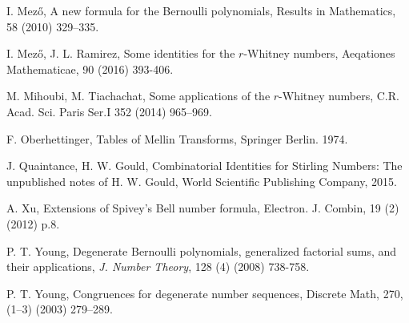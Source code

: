 \documentclass{article}%
\begin{document}
\begin{thebibliography}{99}
I. Mez\H{o}, A new formula for the Bernoulli polynomials,
Results in Mathematics, 58 (2010) 329--335.

I. Mez\H{o}, J. L. Ramirez, Some identities for the
$r$-Whitney numbers, Aeqationes Mathematicae, 90 (2016) 393-406.

M. Mihoubi, M. Tiachachat, Some applications of the
$r$-Whitney numbers, C.R. Acad. Sci. Paris Ser.I 352 (2014) 965--969.

F. Oberhettinger, Tables of Mellin Transforms,
Springer Berlin. 1974.

J. Quaintance, H. W. Gould, Combinatorial Identities for
Stirling Numbers: The unpublished notes of H. W. Gould, World Scientific
Publishing Company, 2015.

A. Xu, Extensions of Spivey's Bell number formula, Electron.
J. Combin, 19 (2) (2012) p.8.

P. T. Young, Degenerate Bernoulli polynomials, generalized
factorial sums, and their applications, \textit{J. Number Theory}, 128 (4)
(2008) 738-758.

P. T. Young, Congruences for degenerate number sequences,
Discrete Math, 270, (1--3) (2003) 279--289.
\end{thebibliography}
\end{document}
